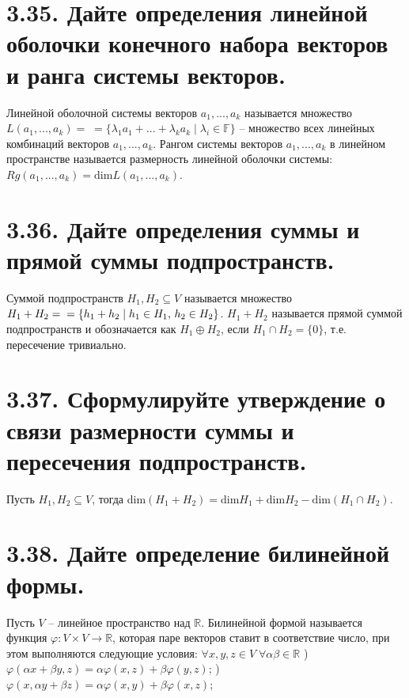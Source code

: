 \documentclass{article}
\begin{document}
\section*{\LARGE 3.35. Дайте определения линейной оболочки конечного набора векторов и ранга системы векторов. }
Линейной оболочной системы векторов $a_1, ..., a_k$ называется множество $L(a_1, ..., a_k) = \; = \{\lambda_1a_1 + ... + \lambda_ka_k \;|\; \lambda_i \in \mathbb{F} \}$ -- множество всех линейных комбинаций векторов $a_1, ..., a_k$.
\newline Рангом системы векторов $a_1, ..., a_k$ в линейном пространстве называется размерность линейной оболочки системы: $Rg(a_1, ..., a_k) = \mbox{dim}L(a_1,...,a_k)$.

\section*{\LARGE 3.36. Дайте определения суммы и прямой суммы подпространств. }
Суммой подпространств $H_1, H_2 \subseteq V$ называется множество $H_1 + H_2 = \newline = \{h_1 + h_2 \;|\; h_1 \in H_1,\, h_2 \in H_2\}$. $H_1 + H_2$ называется прямой суммой подпространств и обозначается как $H_1 \oplus H_2$, если $H_1 \cap H_2 = \{0\}$, т.е. пересечение тривиально.

\section*{\LARGE 3.37. Сформулируйте утверждение о связи размерности суммы и пересечения подпространств. }
Пусть $H_1, H_2 \subseteq V$, тогда dim$(H_1 + H_2) = \mbox{dim}H_1 + \mbox{dim}H_2 - \mbox{dim}(H_1 \cap H_2)$.

\section*{\LARGE 3.38. Дайте определение билинейной формы.}
Пусть $V$ -- линейное пространство над $\mathbb{R}$. Билинейной формой называется функция $\varphi : V \times V \rightarrow \mathbb{R}$, которая паре векторов ставит в соответствие число, при этом выполняются следующие условия:
\newline $\forall x,y,z \in V \; \forall \alpha \beta \in \mathbb{R}$
\newline{}) $\varphi(\alpha x + \beta y, z) = \alpha \varphi(x, z) + \beta \varphi (y, z)$;
\newline{}) $\varphi(x, \alpha y + \beta z) = \alpha \varphi(x, y) + \beta \varphi (x, z)$;
\end{document}
